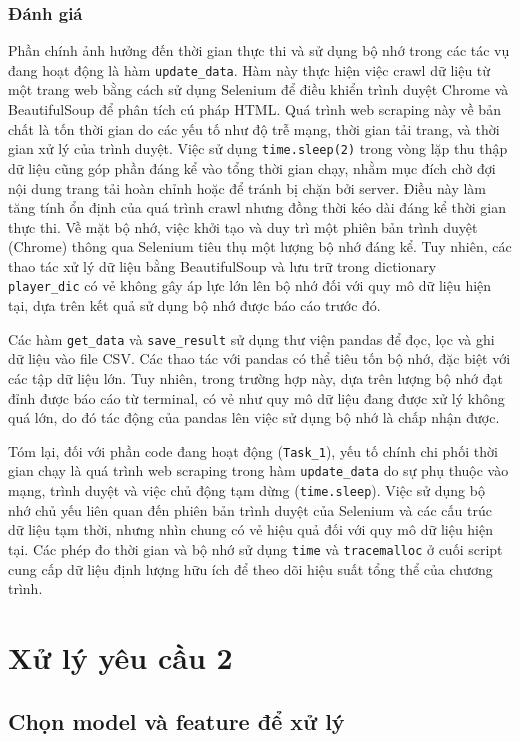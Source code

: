\documentclass[12pt]{report}
\begin{document}
{\subsubsection{Đánh giá}
Phần chính ảnh hưởng đến thời gian thực thi và sử dụng bộ nhớ trong các tác vụ đang hoạt động là hàm \texttt{update\_data}. Hàm này thực hiện việc crawl dữ liệu từ một trang web bằng cách sử dụng Selenium để điều khiển trình duyệt Chrome và BeautifulSoup để phân tích cú pháp HTML. Quá trình web scraping này về bản chất là tốn thời gian do các yếu tố như độ trễ mạng, thời gian tải trang, và thời gian xử lý của trình duyệt. Việc sử dụng \texttt{time.sleep(2)} trong vòng lặp thu thập dữ liệu cũng góp phần đáng kể vào tổng thời gian chạy, nhằm mục đích chờ đợi nội dung trang tải hoàn chỉnh hoặc để tránh bị chặn bởi server. Điều này làm tăng tính ổn định của quá trình crawl nhưng đồng thời kéo dài đáng kể thời gian thực thi. Về mặt bộ nhớ, việc khởi tạo và duy trì một phiên bản trình duyệt (Chrome) thông qua Selenium tiêu thụ một lượng bộ nhớ đáng kể. Tuy nhiên, các thao tác xử lý dữ liệu bằng BeautifulSoup và lưu trữ trong dictionary \texttt{player\_dic} có vẻ không gây áp lực lớn lên bộ nhớ đối với quy mô dữ liệu hiện tại, dựa trên kết quả sử dụng bộ nhớ được báo cáo trước đó.

Các hàm \texttt{get\_data} và \texttt{save\_result} sử dụng thư viện pandas để đọc, lọc và ghi dữ liệu vào file CSV. Các thao tác với pandas có thể tiêu tốn bộ nhớ, đặc biệt với các tập dữ liệu lớn. Tuy nhiên, trong trường hợp này, dựa trên lượng bộ nhớ đạt đỉnh được báo cáo từ terminal, có vẻ như quy mô dữ liệu đang được xử lý không quá lớn, do đó tác động của pandas lên việc sử dụng bộ nhớ là chấp nhận được.

Tóm lại, đối với phần code đang hoạt động (\texttt{Task\_1}), yếu tố chính chi phối thời gian chạy là quá trình web scraping trong hàm \texttt{update\_data} do sự phụ thuộc vào mạng, trình duyệt và việc chủ động tạm dừng (\texttt{time.sleep}). Việc sử dụng bộ nhớ chủ yếu liên quan đến phiên bản trình duyệt của Selenium và các cấu trúc dữ liệu tạm thời, nhưng nhìn chung có vẻ hiệu quả đối với quy mô dữ liệu hiện tại. Các phép đo thời gian và bộ nhớ sử dụng \texttt{time} và \texttt{tracemalloc} ở cuối script cung cấp dữ liệu định lượng hữu ích để theo dõi hiệu suất tổng thể của chương trình.

\section{Xử lý yêu cầu 2}
\subsection{Chọn model và feature để xử lý}
}
\end{document}
